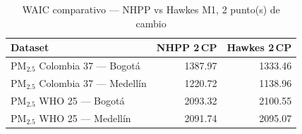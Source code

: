 \begin{table}[htbp]
\centering
\caption{WAIC comparativo --- NHPP vs Hawkes M1, 2 punto(s) de cambio}
\label{tab:comp_waic_2cp}
\begin{tabular}{lrr}
\toprule
Dataset & NHPP 2\,CP & Hawkes 2\,CP \\
\midrule
PM$_{2.5}$ Colombia 37 --- Bogot\'{a} & 1387.97 & 1333.46 \\
PM$_{2.5}$ Colombia 37 --- Medell\'{i}n & 1220.72 & 1138.96 \\
PM$_{2.5}$ WHO 25 --- Bogot\'{a} & 2093.32 & 2100.55 \\
PM$_{2.5}$ WHO 25 --- Medell\'{i}n & 2091.74 & 2095.07 \\
\bottomrule
\end{tabular}
\end{table}
